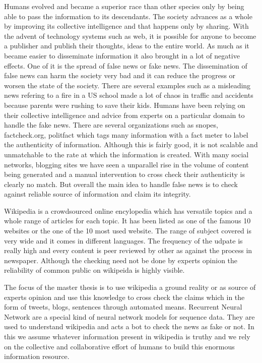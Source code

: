 \documentclass[a4paper, 11pt]{article}
\begin{document}


Humans evolved and became a superior race than other species only by being able to pass the information to its descendants. The society advances as a whole by improving its collective intelligence and that happens only by sharing. With the advent of technology systems such as web, it is possible for anyone to become a publisher and publish their thoughts, ideas to the entire world. As much as it became easier to disseminate information it also brought in a lot of negative effects. One of it is the spread of false news or fake news. The dissemination of false news can harm the society very bad and it can reduce the progress or worsen the state of the society. There are several examples such as a misleading news refering to a fire in a US school made a lot of chaos in traffic and accidents because parents were rushing to save their kids. Humans have been relying on their collective intelligence and advice from experts on a particular domain to handle the fake news. There are several organizations such as snopes, factcheck.org, politfact which tags many information with a fact meter to label the authenticity of information. Although this is fairly good, it is not scalable and unmatchable to the rate at which the information is created. With many social networks, blogging sites we have seen a unparallel rise in the volume of content being generated and a manual intervention to cross check their authenticity is clearly no match. But overall the main idea to handle false news is to check against reliable source of information and claim its integrity.

Wikipedia is a crowdsourced online encylopedia which has versatile topics and a whole range of articles for each topic. It has been listed as one of the famous 10 websites or the one of the 10 most used website. The range of subject covered is very wide and it comes in different languages. The frequency of the udpate is really high and every content is peer reviewed by other as against the process in newspaper. Although the checking need not be done by experts opinion the reliability of common public on wikipeida is highly visible. 

The focus of the master thesis is to use wikipedia a ground reality or as source of experts opinion and use this knowledge to cross check the claims which in the form of tweets, blogs, sentences through automated means. Recurrent Neural Network are a special kind of neural network models for sequence data. They are used to understand wikipedia and acts a bot to check the news as fake or not. In this we assume whatever information present in wikipedia is truthy and we rely on the collective and collaborative effort of humans to build this enormous information resource.
\end{document}
